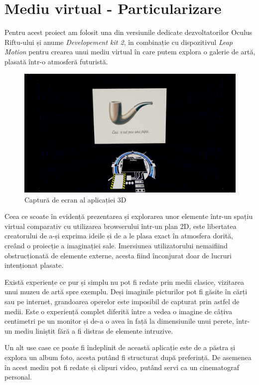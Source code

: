 \chapter{Mediu virtual - Particularizare}

Pentru acest proiect am folosit una din versiunile dedicate dezvoltatorilor Oculus Riftu-ului și anume \textit{Developement kit 2}, în combinație cu dispozitivul \textit{Leap Motion} pentru crearea unui mediu virtual în care putem explora o galerie de artă, plasată într-o atmosferă futuristă.

\begin{figure}[h]
  \centering
  \includegraphics[scale=0.28]{img/screenshot2.png}
  \caption{Captură de ecran al aplicației 3D}
\end{figure}

Ceea ce scoate în evidență prezentarea și explorarea unor elemente într-un spațiu virtual comparativ cu utilizarea browserului într-un plan 2D, este libertatea creatorului de a-și exprima ideile și de a le plasa exact în atmosfera dorită, creând o proiecție a imaginației sale. Imersiunea utilizatorului nemaifiind obstrucționată de elemente externe, acesta fiind înconjurat doar de lucruri intenționat plasate.

Există experiențe ce pur și simplu nu pot fi redate prin medii clasice, vizitarea unui muzeu de artă spre exemplu. Deși imaginile picturilor pot fi găsite în cărți sau pe internet, grandoarea operelor este imposibil de capturat prin astfel de medii. Este o experiență complet diferită între a vedea o imagine de câțiva centimetri pe un monitor și de-a o avea în față la dimensiunile unui perete, într-un mediu liniștit fără a fi distras de elemente intruzive.


Un alt use case ce poate fi îndeplinit de această aplicație este de a păstra și explora un album foto, acesta putând fi structurat după preferință.
De asemenea în acest mediu pot fi redate și clipuri video,  putând servi ca un cinematograf personal.


